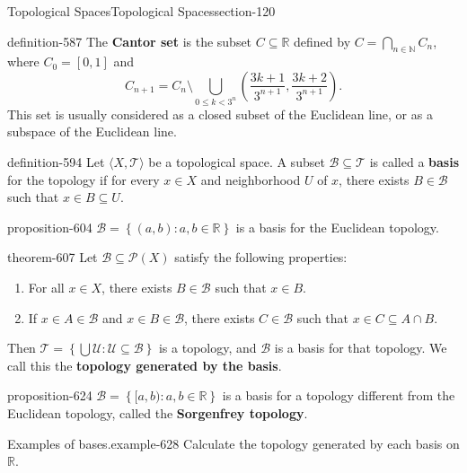 \documentclass[oneside,10pt,]{article}
\newcommand{\terminology}[1]{\textbf{#1}}
\newcommand{\tuple}[1]{\langle #1 \rangle}
\newcommand{\mb}{\mathbb}
\newcommand{\mc}{\mathcal}
\newcommand{\setBuilder}[2]{\left\{#1:#2\right\}}
\newcommand{\lt}{<}
\begin{document}
\begin{sectionptx}{Topological Spaces}{}{Topological Spaces}{}{}{section-120}
\begin{definition}{}{definition-587}
\hypertarget{p-588}{}%
The \terminology{Cantor set} is the subset \(C\subseteq\mb R\) defined by \(C=\bigcap_{n\in\mb N} C_n\), where \(C_0=[0,1]\) and%
\begin{equation*}
C_{n+1}=C_n\setminus\bigcup_{0\leq k\lt 3^n} 
\left(\frac{3k+1}{3^{n+1}},\frac{3k+2}{3^{n+1}}\right).
\end{equation*}
This set is usually considered as a closed subset of the Euclidean line, or as a subspace of the Euclidean line.%
\end{definition}
\begin{definition}{}{definition-594}%
\hypertarget{p-595}{}%
Let \(\tuple{X,\mc T}\) be a topological space. A subset \(\mc B\subseteq\mc T\) is called a \terminology{basis} for the topology if for every \(x\in X\) and neighborhood \(U\) of \(x\), there exists \(B\in\mc B\) such that \(x\in B\subseteq U\).%
\end{definition}
\begin{proposition}{}{}{proposition-604}%
\hypertarget{p-605}{}%
\(\mc B=\setBuilder{(a,b)}{a,b\in\mb R}\) is a basis for the Euclidean topology.%
\end{proposition}
\begin{theorem}{}{}{theorem-607}%
\hypertarget{p-608}{}%
Let \(\mc B\subseteq\mc P(X)\) satisfy the following properties:%
\leavevmode%
\begin{enumerate}
\item\hypertarget{li-611}{}For all \(x\in X\), there exists \(B\in\mc B\) such that \(x\in B\).%
\item\hypertarget{li-615}{}If \(x\in A\in\mc B\) and \(x\in B\in\mc B\), there exists \(C\in\mc B\) such that \(x\in C\subseteq A\cap B\).%
\end{enumerate}
\hypertarget{p-620}{}%
Then \(\mc T=\setBuilder{\bigcup\mc U}{\mc U\subseteq\mc B}\) is a topology, and \(\mc B\) is a basis for that topology. We call this the \terminology{topology generated by the basis}.%
\end{theorem}
\begin{proposition}{}{}{proposition-624}%
\hypertarget{p-625}{}%
\(\mc B=\setBuilder{[a,b)}{a,b\in\mb R}\) is a basis for a topology different from the Euclidean topology, called the \terminology{Sorgenfrey topology}.%
\end{proposition}
\begin{example}{Examples of bases.}{example-628}%
\hypertarget{p-630}{}%
Calculate the topology generated by each basis on \(\mb R\).%
\leavevmode%
\begin{enumerate}

\end{enumerate}
\end{example}
\end{sectionptx}
\end{document}
